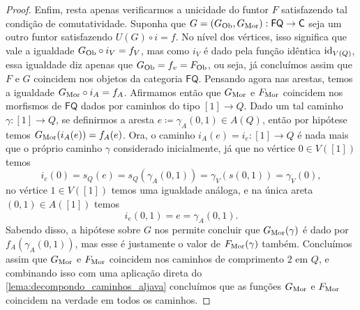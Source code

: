 \begin{proof}
    Enfim, resta apenas verificarmos a unicidade do funtor $F$ satisfazendo tal condição de comutatividade.
    Suponha que $G = (G_{\mathrm{Ob}},G_{\mathrm{Mor}}): \mathsf{FQ} \to \mathsf{C}$ seja um outro funtor satisfazendo $U(G) \circ i = f$.
    No nível dos vértices, isso significa que vale a igualdade $G_{\mathrm{Ob}} \circ i_V = f_V$, mas como $i_V$ é dado pela função idêntica $\mathrm{id}_{V(Q)}$, essa igualdade diz apenas que $G_{\mathrm{Ob}} = f_v = F_{\mathrm{Ob}}$, ou seja, já concluímos assim que $F$ e $G$ coincidem nos objetos da categoria $\mathsf{FQ}$.
    Pensando agora nas arestas, temos a igualdade $G_{\mathrm{Mor}} \circ i_A = f_A$.
    Afirmamos então que $G_{\mathrm{Mor}}$ e $F_{\mathrm{Mor}}$ coincidem nos morfismos de $\mathsf{FQ}$ dados por caminhos do tipo $[1] \to Q$.
    Dado um tal caminho $\gamma: [1] \to Q$, se definirmos a aresta $e \coloneqq \gamma_A(0,1) \in A(Q)$, então por hipótese temos $G_{\mathrm{Mor}}(i_A(e)) = f_A(e)$.
    Ora, o caminho $i_A(e) = i_e: [1] \to Q$ é nada mais que o próprio caminho $\gamma$ considerado inicialmente, já que no vértice $0 \in V([1])$ temos
    \begin{displaymath}
        i_e(0)
        = s_Q(e)
        = s_Q(\gamma_A(0,1))
        = \gamma_V(s(0,1))
        = \gamma_V(0),
    \end{displaymath}
    no vértice $1 \in V([1])$ temos uma igualdade análoga, e na única areta $(0,1) \in A([1])$ temos
    \begin{displaymath}
        i_e(0,1)
        = e
        = \gamma_A(0,1).
    \end{displaymath}
    Sabendo disso, a hipótese sobre $G$ nos permite concluir que $G_{\mathrm{Mor}}(\gamma)$ é dado por $f_A(\gamma_A(0,1))$, mas esse é justamente o valor de $F_{\mathrm{Mor}}(\gamma)$ também.
    Concluímos assim que $G_{\mathrm{Mor}}$ e $F_{\mathrm{Mor}}$ coincidem nos caminhos de comprimento $2$ em $Q$, e combinando isso com uma aplicação direta do \cref{lema:decompondo_caminhos_aljava} concluímos que as funções $G_{\mathrm{Mor}}$ e $F_{\mathrm{Mor}}$ coincidem na verdade em todos os caminhos.
\end{proof}